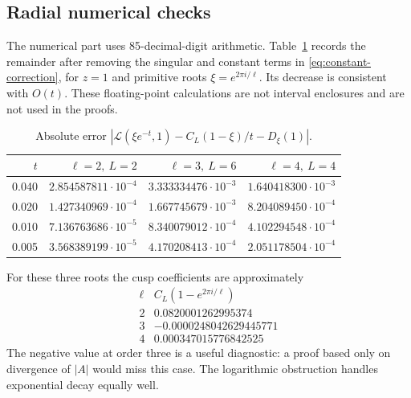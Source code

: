 \documentclass[11pt,a4paper]{article}
\numberwithin{equation}{section}
\theoremstyle{definition}
\theoremstyle{remark}
\newcommand{\LL}{\mathcal L}
\begin{document}
\subsection{Radial numerical checks}
The numerical part uses 85-decimal-digit arithmetic. Table~\ref{tab:cusp} records the remainder after removing the singular and constant terms in \eqref{eq:constant-correction}, for \(z=1\) and primitive roots \(\xi=e^{2\pi i/\ell}\). Its decrease is consistent with \(O(t)\). These floating-point calculations are not interval enclosures and are not used in the proofs.

\begin{table}[htbp]\centering
\caption{Absolute error \(\left|\LL(\xi e^{-t},1)-C_L(1-\xi)/t-D_\xi(1)\right|\).}\label{tab:cusp}
\begin{tabular}{rrrr}
\toprule
\(t\) & \(\ell=2,\ L=2\) & \(\ell=3,\ L=6\) & \(\ell=4,\ L=4\)\\
\midrule
0.040 & \(2.854587811\cdot10^{-4}\) & \(3.333334476\cdot10^{-3}\) & \(1.640418300\cdot10^{-3}\)\\
0.020 & \(1.427340969\cdot10^{-4}\) & \(1.667745679\cdot10^{-3}\) & \(8.204089450\cdot10^{-4}\)\\
0.010 & \(7.136763686\cdot10^{-5}\) & \(8.340079012\cdot10^{-4}\) & \(4.102294548\cdot10^{-4}\)\\
0.005 & \(3.568389199\cdot10^{-5}\) & \(4.170208413\cdot10^{-4}\) & \(2.051178504\cdot10^{-4}\)\\
\bottomrule
\end{tabular}
\end{table}

For these three roots the cusp coefficients are approximately
\[
 \begin{array}{c|r}
 \ell&C_L(1-e^{2\pi i/\ell})\\\hline
 2&0.0820001262995374\\
 3&-0.0000248042629445771\\
 4&0.000347015776842525
 \end{array}
\]
The negative value at order three is a useful diagnostic: a proof based only on divergence of \(|A|\) would miss this case. The logarithmic obstruction handles exponential decay equally well.
\end{document}
